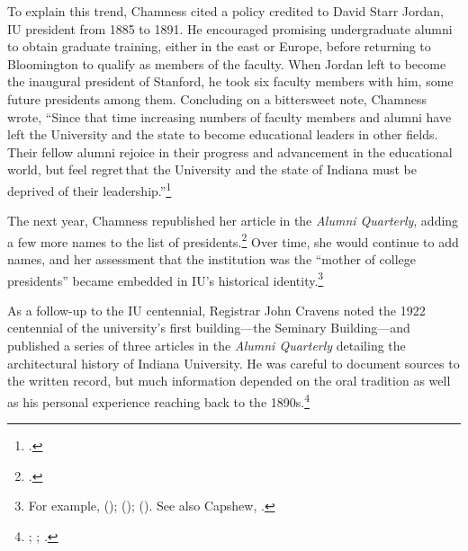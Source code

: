 \documentclass[
  american,
  letterpaper,
]{scrreprt}
\begin{document}
To explain this trend, Chamness cited a policy credited to David Starr
Jordan, IU president from 1885 to 1891. He encouraged promising
undergraduate alumni to obtain graduate training, either in the east or
Europe, before returning to Bloomington to qualify as members of the
faculty. When Jordan left to become the inaugural president of Stanford,
he took six faculty members with him, some future presidents among them.
Concluding on a bittersweet note, Chamness wrote, ``Since that time
increasing numbers of faculty members and alumni have left the
University and the state to become educational leaders in other fields.
Their fellow alumni rejoice in their progress and advancement in the
educational world, but feel regret\,that the University and the state of
Indiana must be deprived of their leadership.''\footnote{.}

The next year, Chamness republished her article in the \emph{Alumni
Quarterly}, adding a few more names to the list of
presidents.\footnote{.} Over time, she would continue to
add names, and her assessment that the institution was the ``mother of
college presidents'' became embedded in IU's historical
identity.\footnote{For example, ();
  ();
  (). See also Capshew,
  .}

As a follow-up to the IU centennial, Registrar John Cravens noted the
1922 centennial of the university's first building---the Seminary
Building---and published a series of three articles in the \emph{Alumni
Quarterly} detailing the architectural history of Indiana University. He
was careful to document sources to the written record, but much
information depended on the oral tradition as well as his personal
experience reaching back to the 1890s.\footnote{;
  ;
  .}
\end{document}
